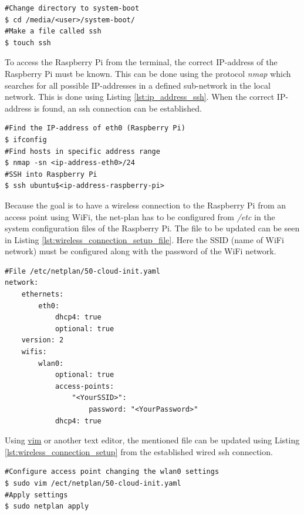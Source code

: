 \documentclass[../Head/report.tex]{subfiles}
\begin{document}
\begin{lstlisting}[frame=none,caption={How to enable ssh communication by making a file called \textit{ssh} to system-boot of the sd card}, label=lst:enable_ssh]
#Change directory to system-boot
$ cd /media/<user>/system-boot/
#Make a file called ssh
$ touch ssh
\end{lstlisting}

To access the Raspberry Pi from the terminal, the correct IP-address of the Raspberry Pi must be known. This can be done using the protocol \textit{nmap} which searches for all possible IP-addresses in a defined sub-network in the local network. This is done using Listing \ref{lst:ip_address_ssh}. When the correct IP-address is found, an ssh connection can be established. 

\begin{lstlisting}[frame=none, caption={Find the IP-address of the Raspberry Pi for \textit{ssh} communication},label=lst:ip_address_ssh]
#Find the IP-address of eth0 (Raspberry Pi) 
$ ifconfig	
#Find hosts in specific address range 
$ nmap -sn <ip-address-eth0>/24
#SSH into Raspberry Pi 
$ ssh ubuntu$<ip-address-raspberry-pi>
\end{lstlisting}

Because the goal is to have a wireless connection to the Raspberry Pi from an access point using WiFi, the net-plan has to be configured from \textit{/etc}  in the system configuration files of the Raspberry Pi. The file to be updated can be seen in Listing \ref{lst:wireless_connection_setup_file}. Here the SSID (name of WiFi network) must be configured along with the password of the WiFi network. 

\begin{lstlisting}[frame=none, caption={File to configure to enable wireless connection},label=lst:wireless_connection_setup_file]
#File /etc/netplan/50-cloud-init.yaml
network:
    ethernets:
        eth0:
            dhcp4: true
            optional: true
    version: 2
    wifis:
        wlan0:
            optional: true
            access-points:
                "<YourSSID>":
                    password: "<YourPassword>"
            dhcp4: true

\end{lstlisting}

Using \href{https://www.vim.org/}{vim} or another text editor, the mentioned file can be updated using Listing \ref{lst:wireless_connection_setup} from the established wired ssh connection.  

\begin{lstlisting}[frame=none, caption={Create an access point from a wireless connection by configuring netplan},label=lst:wireless_connection_setup]
#Configure access point changing the wlan0 settings
$ sudo vim /ect/netplan/50-cloud-init.yaml
#Apply settings  
$ sudo netplan apply
\end{lstlisting}
\end{document}
